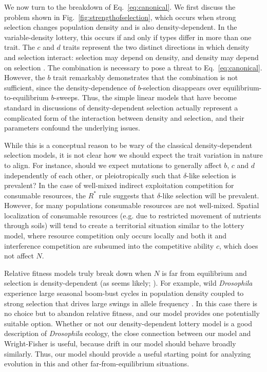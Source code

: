 \documentclass[12pt]{article}
\begin{document}
We now turn to the breakdown of Eq.~\eqref{eq:canonical}. We first discuss the problem shown in Fig.~\ref{fig:strengthofselection}, which occurs when strong selection changes population density and is also density-dependent. In the variable-density lottery, this occurs if and only if types differ in more than one trait. The $c$ and $d$ traits represent the two distinct directions in which density and selection interact: selection may depend on density, and density may depend on selection \citep{prout_1980}. The combination is necessary to pose a threat to Eq.~\eqref{eq:canonical}. However, the $b$ trait remarkably demonstrates that the combination is not sufficient, since the density-dependence of $b$-selection disappears over equilibrium-to-equilibrium $b$-sweeps. Thus, the simple linear models that have become standard in discussions of density-dependent selection \citep{roughgarden_1979,christiansen_2004,mallet_2012,travis_2013} actually represent a complicated form of the interaction between density and selection, and their parameters confound the underlying issues. 

While this is a conceptual reason to be wary of the classical density-dependent selection models, it is not clear how we should expect the trait variation in nature to align. For instance, should we expect mutations to generally affect $b$, $c$ and $d$ independently of each other, or pleiotropically such that $\delta$-like selection is prevalent? In the case of well-mixed indirect exploitation competition for consumable resources, the $R^*$ rule  suggests that $\delta$-like selection will be prevalent. However, for many populations consumable resources are not well-mixed. Spatial localization of consumable resources (e.g. due to restricted movement of  nutrients through soils) will tend to create a territorial situation similar to the lottery model, where resource competition only occurs locally and both it and interference competition are subsumed into the competitive ability $c$, which does not affect $N$. 

Relative fitness models truly break down when $N$ is far from equilibrium and selection is density-dependent (as seems likely; \citealt{travis_2013}). For example, wild \textit{Drosophila} experience large seasonal boom-bust cycles in population density coupled to strong selection that drives large swings in allele frequency \citep{bergland_14}. In this case there is no choice but to abandon relative fitness, and our model provides one potentially suitable option. Whether or not our density-dependent lottery model is a good description of \textit{Drosophila} ecology, the close connection between our model and Wright-Fisher is useful, because drift in our model should behave broadly similarly. Thus, our model should provide a useful starting point for analyzing evolution in this and other far-from-equilibrium situations. 
\end{document}
